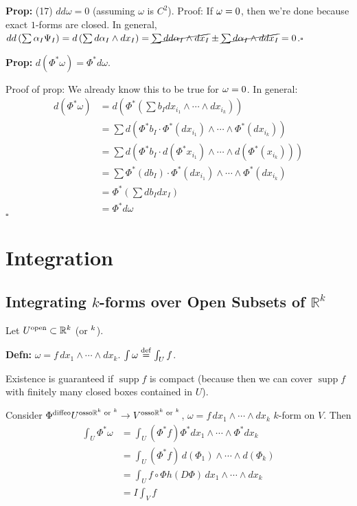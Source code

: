 \documentclass[10pt,letterpaper]{article}
\newcommand{\n}{\hfill\break}
\newcommand{\up}{\vspace{-\baselineskip}}
\newcommand{\defn}[1]{\par\noindent\settowidth{\hangindent}{\textbf{Defn: }}\textbf{Defn: }#1\n}
\newcommand{\prop}[1]{\par\noindent\settowidth{\hangindent}{\textbf{Prop: }}\textbf{Prop: }#1\n}
\newcommand{\proven}{\;$\square$\n}
\newcommand{\ptxt}[1]{\textrm{\textnormal{#1}}}
\newcommand{\reals}{\mathbb{R}}
\newcommand{\R}{\reals}
\newcommand{\halfPlane}{\mathbb{H}}
\let\H\relax
\newcommand{\H}{\halfPlane}
\let\deg\relax
\DeclareMathOperator{\deg}{deg}
\newcommand{\of}{\circ}
\DeclareMathOperator{\supp}{supp}
\newcommand{\eqdef}{\overset{\ptxt{def}}{=}}
\newcommand{\paren}[1]{\left(#1\right)}
\begin{document}
\prop{(17) $dd\omega=0$ (assuming $\omega$ is $C^{2}$).\n
Proof: If $\deg\omega=0$, then we're done because exact $1$-forms are closed.\n
In general, $dd\paren{\sum{}\alpha_{I}\Psi_{I}}=d\paren{\sum{}d\alpha_{I}\wedge{}dx_{I}}=\cancel{\sum{}dd\alpha_{I}\wedge{}dx_{I}}\pm\cancel{\sum{}d\alpha_{I}\wedge{}dd{}x_{I}}=0$.\proven}

\prop{$d(\Phi^{*}\omega)=\Phi^{*}d\omega$.}

\par\noindent Proof of prop: We already know this to be true for $\deg\omega=0$.\n
In general:
\begin{align*}
	d(\Phi^{*}\omega) & =d\paren{\Phi^{*}\paren{\sum{}b_{I}dx_{i_{1}}\wedge\cdots\wedge{}dx_{i_{k}}}}\\
	& =\sum{}d\paren{\Phi^{*}b_{I}\cdot\Phi^{*}(dx_{i_{1}})\wedge\cdots\wedge\Phi^{*}(dx_{i_{k}})}\\
	& =\sum{}d\paren{\Phi^{*}b_{I}\cdot{}d(\Phi^{*}x_{i_{1}})\wedge\cdots\wedge{}d(\Phi^{*}(x_{i_{k}}))}\\
	& =\sum{}\Phi^{*}(db_{I})\cdot\Phi^{*}(dx_{i_{1}})\wedge\cdots\wedge\Phi^{*}(dx_{i_{k}})\\
	& =\Phi^{*}\paren{\sum{}db_{I}dx_{I}}\\
	& =\Phi^{*}d\omega
\end{align*}\up\n
\proven

\section*{Integration}

\subsection{Integrating $k$-forms over Open Subsets of $\R^{k}$}

\par\noindent Let $U^{\ptxt{open}}\subset\R^{k}$ (or $\H^{k}$).

\defn{$\omega=f\,dx_{1}\wedge\cdots\wedge{}dx_{k}$. $\int\omega\eqdef\int_{U}f$.}

\par\noindent Existence is guaranteed if $\supp{}f$ is compact (because then we can cover $\supp{}f$ with finitely many closed boxes contained in $U$).\n

\par\noindent Consider $\Phi^{\ptxt{diffeo}}U^{\ptxt{osso}\R^{k}\ptxt{ or }\H^{k}}\to{}V^{\ptxt{osso}\R^{k}\ptxt{ or }\H^{k}}$, $\omega=f\,dx_{1}\wedge\cdots\wedge{}dx_{k}$ $k$-form on $V$. Then
\begin{align*}
	\int_{U}\Phi^{*}\omega & =\int_{U}(\Phi^{*}f)\Phi^{*}dx_{1}\wedge\cdots\wedge\Phi^{*}dx_{k}\\
	& =\int_{U}(\Phi^{*}f)\,d(\Phi_{1})\wedge\cdots\wedge{}d(\Phi_{k})\\
	& =\int_{U}f\of\Phi{}h(D\Phi)\,dx_{1}\wedge\cdots\wedge{}dx_{k}\\
	& =I\int_{V}f
\end{align*}
\end{document}
